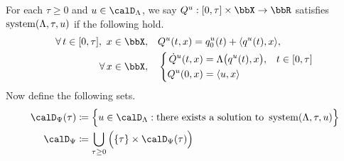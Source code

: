 \begin{definition}
  \label{definition:momentSpace}
  For each $\tau \geq 0$ and $\momentVar \in \odeSpace$, we say $Q^\momentVar: [0,\tau] \times \stateSpace \rightarrow \bbR$ satisfies $\operatorname{system}(\Lambda, \tau,u)$ if the following hold.
  \begin{equation}
    \label{eq:riccati-system}
    \begin{aligned}
      \forall\, t \in [0,\tau], ~ \stateVar \in \stateSpace, \quad
      & Q^\momentVar(t, \stateVar) = q_0^\momentVar(t) + \prj{q^\momentVar(t)}{\stateVar},  \\
      \forall\, \stateVar \in \stateSpace, \quad
      & \left\{\begin{aligned}
        \dot Q^\momentVar(t, \stateVar) &= \ode\big(q^\momentVar(t), \stateVar\big), & t \in [0,\tau] \\
        Q^\momentVar(0, \stateVar) &= \prj{\momentVar}{\stateVar}
      \end{aligned}\right.
    \end{aligned}
  \end{equation}
  Now define the following sets.
  \begin{align*}
    \momentSpace(\tau) &\defeq \Big\{ \momentVar \in \odeSpace : \text{there exists a solution to } \system(\ode,\tau,\momentVar) \Big\} \\
    \momentSpace &\defeq \bigcup_{\tau\geq 0} \Big( \{\tau\} \times \momentSpace(\tau) \Big)
  \end{align*}
\end{definition}
